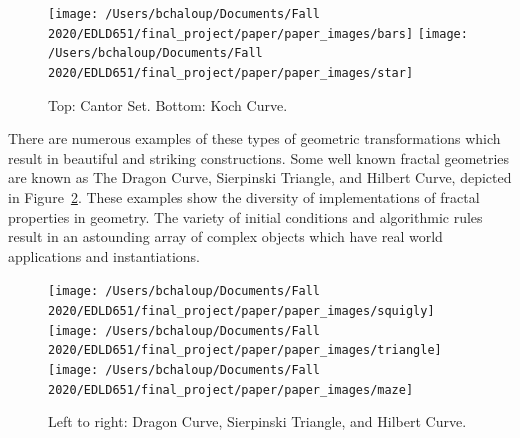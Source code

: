 \documentclass[english,jou]{apa6}
\begin{document}
\begin{figure}

{\centering \texttt{[image: /Users/bchaloup/Documents/Fall 2020/EDLD651/final\_project/paper/paper\_images/bars]} \texttt{[image: /Users/bchaloup/Documents/Fall 2020/EDLD651/final\_project/paper/paper\_images/star]} 

}

\caption{Top: Cantor Set. Bottom: Koch Curve.}\label{fig:kochcantor}
\end{figure}

There are numerous examples of these types of geometric transformations which result in beautiful and striking constructions. Some well known fractal geometries are known as The Dragon Curve, Sierpinski Triangle, and Hilbert Curve, depicted in Figure~\ref{fig:threees}. These examples show the diversity of implementations of fractal properties in geometry. The variety of initial conditions and algorithmic rules result in an astounding array of complex objects which have real world applications and instantiations.

\begin{figure}

{\centering \texttt{[image: /Users/bchaloup/Documents/Fall 2020/EDLD651/final\_project/paper/paper\_images/squigly]} \texttt{[image: /Users/bchaloup/Documents/Fall 2020/EDLD651/final\_project/paper/paper\_images/triangle]} \texttt{[image: /Users/bchaloup/Documents/Fall 2020/EDLD651/final\_project/paper/paper\_images/maze]} 

}

\caption{Left to right: Dragon Curve, Sierpinski Triangle, and Hilbert Curve.}\label{fig:threees}
\end{figure}
\end{document}
